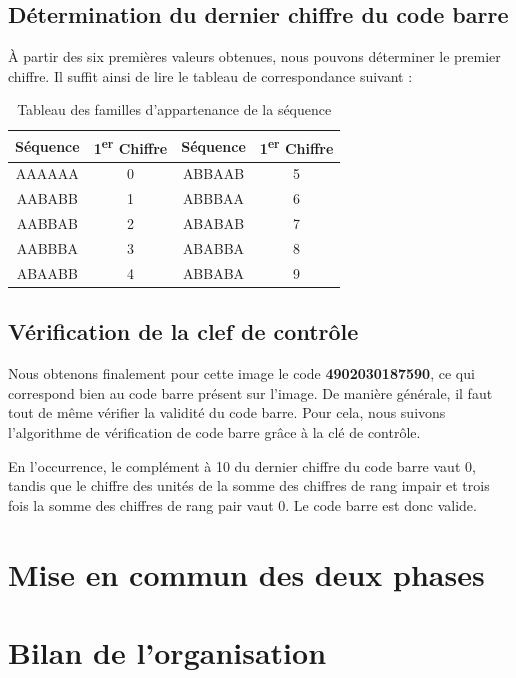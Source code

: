 \documentclass{rapport}
\begin{document}
\subsection{Détermination du dernier chiffre du code barre}
À partir des six premières valeurs obtenues, nous pouvons déterminer le premier chiffre. 
Il suffit ainsi de lire le tableau de correspondance suivant :

\begin{table}[h!]
    \centering
    \renewcommand{\arraystretch}{1.5} %
    \begin{tabular}{|c|c|c|c|}
        \hline
        \textbf{Séquence} & \textbf{1\textsuperscript{er} Chiffre} & \textbf{Séquence} & \textbf{1\textsuperscript{er} Chiffre} \\ \hline
        AAAAAA & 0 & ABBAAB & 5 \\ \hline
        AABABB & 1 & ABBBAA & 6 \\ \hline
        AABBAB & 2 & ABABAB & 7 \\ \hline
        AABBBA & 3 & ABABBA & 8 \\ \hline
        ABAABB & 4 & ABBABA & 9 \\ \hline
    \end{tabular}
    \caption{Tableau des familles d’appartenance de la séquence}
    \label{tab:sequence}
\end{table}

\subsection{Vérification de la clef de contrôle}
Nous obtenons finalement pour cette image le code \textbf{4902030187590}, ce qui correspond bien au code barre présent sur l'image.
De manière générale, il faut tout de même vérifier la validité du code barre. Pour cela, nous suivons l'algorithme de vérification de code barre grâce à la clé de contrôle.

En l'occurrence, le complément à 10 du dernier chiffre du code barre vaut 0, tandis que le chiffre des unités de la somme des chiffres de rang impair et trois fois la somme des chiffres de rang pair vaut 0. 
Le code barre est donc valide.

\section{Mise en commun des deux phases}

\section{Bilan de l'organisation}
\end{document}
